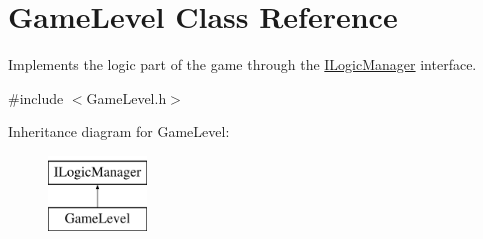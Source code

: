 \hypertarget{class_game_level}{}\section{Game\+Level Class Reference}
\label{class_game_level}


Implements the logic part of the game through the \mbox{\hyperlink{class_i_logic_manager}{I\+Logic\+Manager}} interface.  




{\ttfamily \#include $<$Game\+Level.\+h$>$}

Inheritance diagram for Game\+Level\+:\begin{figure}[H]
\begin{center}
\leavevmode
\includegraphics[height=2.000000cm]{class_game_level}
\end{center}
\end{figure}
